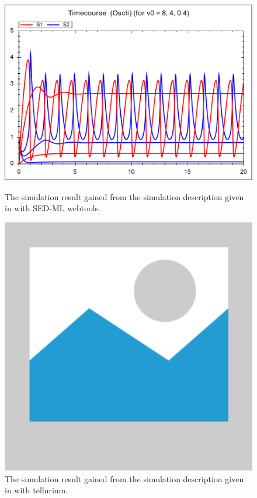 \begin{figure}[ht]
    \centering
    \begin{minipage}{0.47\textwidth}
        \centering
        \includegraphics[width=1.0\textwidth]{examples/repeated-scan-oscli/results/repeated-scan-oscli}
        \caption{The simulation result gained from the simulation description given in  with SED-ML webtools.}
    \end{minipage}\hfill
    \begin{minipage}{0.47\textwidth}
        \centering
        \includegraphics[width=1.0\textwidth]{examples/placeholder}
        \caption{The simulation result gained from the simulation description given in  with tellurium.}
    \end{minipage}
    \label{fig:repeated-scan-oscli}
\end{figure}

